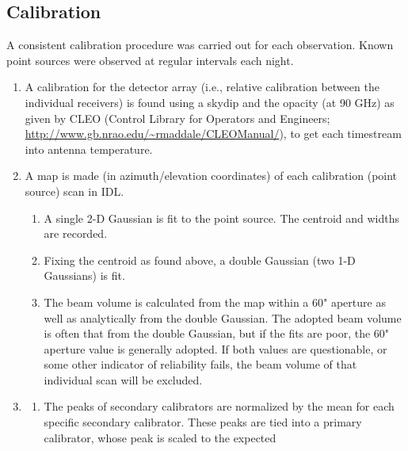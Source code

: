 \documentclass[twocolumn]{aastex62}
\begin{document}
\subsection{Calibration}


A consistent calibration procedure was carried out for each observation.
Known point sources were observed at regular intervals each night.

\begin{enumerate}
    \item A calibration for the detector array (i.e., relative calibration between
        the individual receivers) is found using a skydip and the
        opacity (at 90 GHz) as given by CLEO (Control Library for Operators and
        Engineers; \url{http://www.gb.nrao.edu/~rmaddale/CLEOManual/}), to get
        each timestream into
        antenna temperature.
    \item A map is made (in azimuth/elevation coordinates) of each calibration
        (point source) scan in IDL.
        \begin{enumerate}
            \item A single 2-D Gaussian is fit to the point source. The
                centroid and widths are recorded.
            \item Fixing the centroid as found above, a double Gaussian (two
                1-D Gaussians) is fit.
            \item The beam volume is calculated from the map within a 60"
                aperture as well as analytically from the double Gaussian. The
                adopted beam volume is often that from the double Gaussian, but
                if the fits are poor, the 60" aperture value is generally
                adopted. If both values are questionable, or some other
                indicator of reliability fails, the beam volume of that
                individual scan will be excluded.
        \end{enumerate}
    \item
        \begin{enumerate}
            \item The peaks of secondary calibrators are normalized by the mean
                for each specific secondary calibrator. These peaks are tied
                into a primary calibrator, whose peak is scaled to the expected

\end{enumerate}
\end{enumerate}
\end{document}
